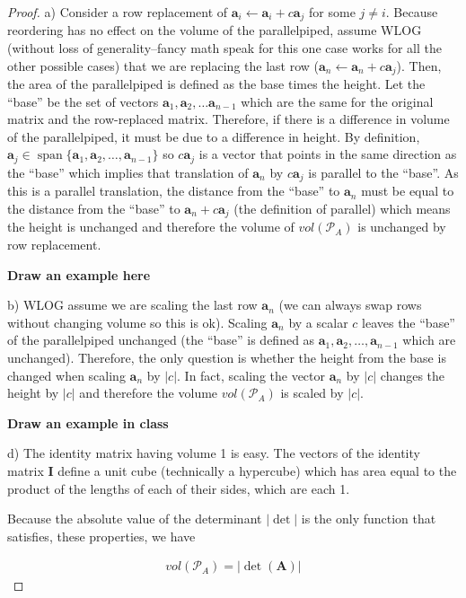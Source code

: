 \documentclass[
]{book}
\theoremstyle{definition}
\theoremstyle{definition}
\theoremstyle{definition}
\theoremstyle{definition}
\theoremstyle{remark}
\begin{document}
\begin{proof}
a) Consider a row replacement of \(\mathbf{a}_i \leftarrow \mathbf{a}_i + c \mathbf{a}_j\) for some \(j \neq i\). Because reordering has no effect on the volume of the parallelpiped, assume WLOG (without loss of generality--fancy math speak for this one case works for all the other possible cases) that we are replacing the last row (\(\mathbf{a}_n \leftarrow \mathbf{a}_n + c \mathbf{a}_j\)). Then, the area of the parallelpiped is defined as the base times the height. Let the ``base'' be the set of vectors \(\mathbf{a}_1, \mathbf{a}_2, \ldots \mathbf{a}_{n-1}\) which are the same for the original matrix and the row-replaced matrix. Therefore, if there is a difference in volume of the parallelpiped, it must be due to a difference in height. By definition, \(\mathbf{a}_j \in \operatorname{span}\{\mathbf{a}_1, \mathbf{a}_2, \ldots, \mathbf{a}_{n-1}\}\) so \(c \mathbf{a}_j\) is a vector that points in the same direction as the ``base'' which implies that translation of \(\mathbf{a}_n\) by \(c \mathbf{a}_j\) is parallel to the ``base''. As this is a parallel translation, the distance from the ``base'' to \(\mathbf{a}_n\) must be equal to the distance from the ``base'' to \(\mathbf{a}_n + c \mathbf{a}_j\) (the definition of parallel) which means the height is unchanged and therefore the volume of \(vol(\mathcal{P}_A)\) is unchanged by row replacement.

\textbf{Draw an example here}

b) WLOG assume we are scaling the last row \(\mathbf{a}_n\) (we can always swap rows without changing volume so this is ok). Scaling \(\mathbf{a}_n\) by a scalar \(c\) leaves the ``base'' of the parallelpiped unchanged (the ``base'' is defined as \(\mathbf{a}_1, \mathbf{a}_2, \ldots, \mathbf{a}_{n-1}\) which are unchanged). Therefore, the only question is whether the height from the base is changed when scaling \(\mathbf{a}_n\) by \(|c|\). In fact, scaling the vector \(\mathbf{a}_n\) by \(|c|\) changes the height by \(|c|\) and therefore the volume \(vol(\mathcal{P}_A)\) is scaled by \(|c|\).

\textbf{Draw an example in class}

d) The identity matrix having volume 1 is easy. The vectors of the identity matrix \(\mathbf{I}\) define a unit cube (technically a hypercube) which has area equal to the product of the lengths of each of their sides, which are each 1.

Because the absolute value of the determinant \(|\det|\) is the only function that satisfies, these properties, we have

\[
\begin{aligned}
vol(\mathcal{P}_A) = |\det(\mathbf{A})|
\end{aligned}
\]
\end{proof}
\end{document}
